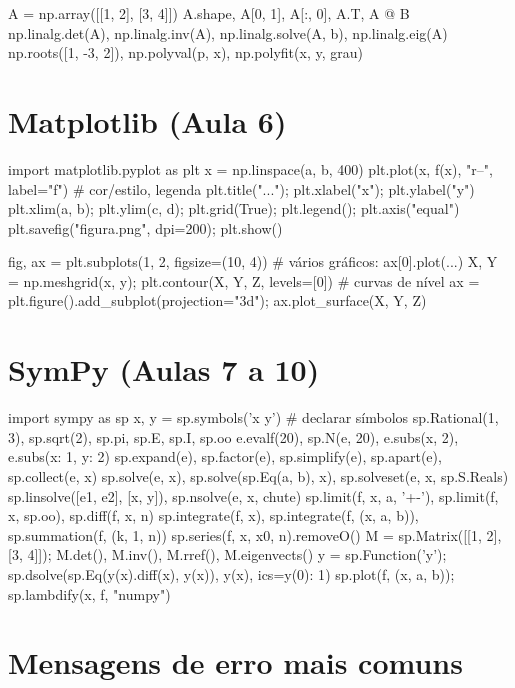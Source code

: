 \begin{codigo}
A = np.array([[1, 2], [3, 4]])
A.shape, A[0, 1], A[:, 0], A.T, A @ B
np.linalg.det(A), np.linalg.inv(A), np.linalg.solve(A, b), np.linalg.eig(A)
np.roots([1, -3, 2]), np.polyval(p, x), np.polyfit(x, y, grau)
\end{codigo}

\section*{Matplotlib (Aula 6)}

\begin{codigo}
import matplotlib.pyplot as plt
x = np.linspace(a, b, 400)
plt.plot(x, f(x), "r--", label="f")      # cor/estilo, legenda
plt.title("..."); plt.xlabel("x"); plt.ylabel("y")
plt.xlim(a, b); plt.ylim(c, d); plt.grid(True); plt.legend(); plt.axis("equal")
plt.savefig("figura.png", dpi=200); plt.show()

fig, ax = plt.subplots(1, 2, figsize=(10, 4))   # vários gráficos: ax[0].plot(...)
X, Y = np.meshgrid(x, y); plt.contour(X, Y, Z, levels=[0])   # curvas de nível
ax = plt.figure().add_subplot(projection="3d"); ax.plot_surface(X, Y, Z)
\end{codigo}

\section*{SymPy (Aulas 7 a 10)}

\begin{codigo}
import sympy as sp
x, y = sp.symbols('x y')                       # declarar símbolos
sp.Rational(1, 3), sp.sqrt(2), sp.pi, sp.E, sp.I, sp.oo
e.evalf(20), sp.N(e, 20), e.subs(x, 2), e.subs({x: 1, y: 2})
sp.expand(e), sp.factor(e), sp.simplify(e), sp.apart(e), sp.collect(e, x)
sp.solve(e, x), sp.solve(sp.Eq(a, b), x), sp.solveset(e, x, sp.S.Reals)
sp.linsolve([e1, e2], [x, y]), sp.nsolve(e, x, chute)
sp.limit(f, x, a, '+-'), sp.limit(f, x, sp.oo), sp.diff(f, x, n)
sp.integrate(f, x), sp.integrate(f, (x, a, b)), sp.summation(f, (k, 1, n))
sp.series(f, x, x0, n).removeO()
M = sp.Matrix([[1, 2], [3, 4]]); M.det(), M.inv(), M.rref(), M.eigenvects()
y = sp.Function('y'); sp.dsolve(sp.Eq(y(x).diff(x), y(x)), y(x), ics={y(0): 1})
sp.plot(f, (x, a, b)); sp.lambdify(x, f, "numpy")
\end{codigo}

\section*{Mensagens de erro mais comuns}

